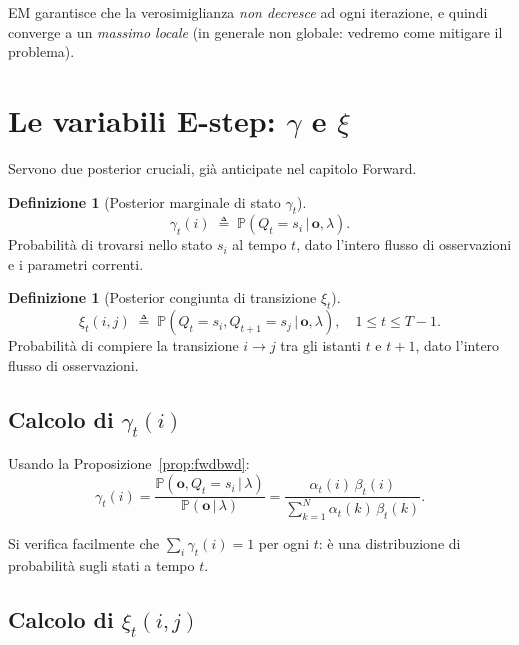 \documentclass[11pt,a4paper,oneside]{book}
\theoremstyle{plain}
\theoremstyle{definition}
\newtheorem{definizione}[teorema]{Definizione}
\theoremstyle{remark}
\newcommand{\Prob}{\mathbb{P}}
\newcommand{\hmm}{\lambda}                   %
\newcommand{\Nstates}{N}                     %
\newcommand{\Tlen}{T}                        %
\newcommand{\seqobs}{\mathbf{o}}             %
\newcommand{\fwd}{\alpha}                    %
\newcommand{\bwd}{\beta}                     %
\newcommand{\gam}{\gamma}                    %
\newcommand{\xig}{\xi}                       %
\newcommand{\given}{\,\vert\,}
\begin{document}
EM garantisce che la verosimiglianza \emph{non decresce} ad ogni
iterazione, e quindi converge a un \emph{massimo locale} (in
generale non globale: vedremo come mitigare il problema).

\section{Le variabili E-step: \texorpdfstring{$\gam$}{gamma} e \texorpdfstring{$\xig$}{xi}}

Servono due posterior cruciali, già anticipate nel capitolo Forward.

\begin{definizione}[Posterior marginale di stato $\gam_t$]
\begin{equation}
\gam_t(i) \;\triangleq\; \Prob(Q_t=s_i\given\seqobs,\hmm).
\label{eq:gamma_def}
\end{equation}
Probabilità di trovarsi nello stato $s_i$ al tempo $t$, dato l'intero
flusso di osservazioni e i parametri correnti.
\end{definizione}

\begin{definizione}[Posterior congiunta di transizione $\xig_t$]
\begin{equation}
\xig_t(i,j) \;\triangleq\; \Prob(Q_t=s_i,Q_{t+1}=s_j\given\seqobs,\hmm),
\quad 1\le t\le\Tlen-1.
\label{eq:xi_def}
\end{equation}
Probabilità di compiere la transizione $i\to j$ tra gli istanti $t$ e
$t+1$, dato l'intero flusso di osservazioni.
\end{definizione}

\subsection{Calcolo di \texorpdfstring{$\gam_t(i)$}{gamma t(i)}}

Usando la Proposizione~\ref{prop:fwdbwd}:
\begin{equation}
\gam_t(i)
= \frac{\Prob(\seqobs,Q_t=s_i\given\hmm)}{\Prob(\seqobs\given\hmm)}
= \frac{\fwd_t(i)\,\bwd_t(i)}{\displaystyle\sum_{k=1}^{\Nstates}\fwd_t(k)\,\bwd_t(k)}.
\label{eq:gamma_formula}
\end{equation}

Si verifica facilmente che $\sum_i\gam_t(i)=1$ per ogni $t$: è una
distribuzione di probabilità sugli stati a tempo $t$.

\subsection{Calcolo di \texorpdfstring{$\xig_t(i,j)$}{xi t(i,j)}}
\end{document}
